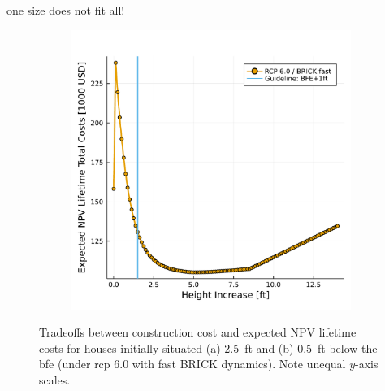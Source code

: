 \begin{block}{one size does not fit all!}
\begin{framed}
\begin{figure}
\begin{subfigure}{0.48\textwidth}
                \includegraphics[width=\textwidth]{7.5.pdf}
            \end{subfigure}
            \caption{
                Tradeoffs between construction cost and expected NPV lifetime costs for houses initially situated (a) \SI{2.5}{ft} and (b) \SI{0.5}{ft} below the \gls{bfe} (under \gls{rcp} 6.0 with fast BRICK \cite{wong_brick0.2:2017} dynamics).
                Note unequal $y$-axis scales.
            }
        \end{figure}
    \end{framed}
\end{block}